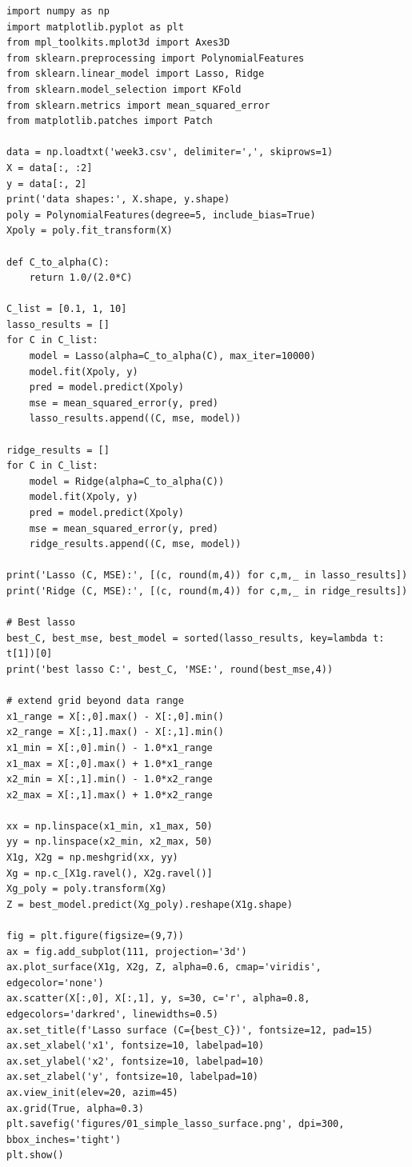 \documentclass[11pt,a4paper]{article}
\begin{document}
\begin{lstlisting}
import numpy as np
import matplotlib.pyplot as plt
from mpl_toolkits.mplot3d import Axes3D
from sklearn.preprocessing import PolynomialFeatures
from sklearn.linear_model import Lasso, Ridge
from sklearn.model_selection import KFold
from sklearn.metrics import mean_squared_error
from matplotlib.patches import Patch

data = np.loadtxt('week3.csv', delimiter=',', skiprows=1)
X = data[:, :2]
y = data[:, 2]
print('data shapes:', X.shape, y.shape)
poly = PolynomialFeatures(degree=5, include_bias=True)
Xpoly = poly.fit_transform(X)

def C_to_alpha(C):
    return 1.0/(2.0*C)

C_list = [0.1, 1, 10]
lasso_results = []
for C in C_list:
    model = Lasso(alpha=C_to_alpha(C), max_iter=10000)
    model.fit(Xpoly, y)
    pred = model.predict(Xpoly)
    mse = mean_squared_error(y, pred)
    lasso_results.append((C, mse, model))

ridge_results = []
for C in C_list:
    model = Ridge(alpha=C_to_alpha(C))
    model.fit(Xpoly, y)
    pred = model.predict(Xpoly)
    mse = mean_squared_error(y, pred)
    ridge_results.append((C, mse, model))

print('Lasso (C, MSE):', [(c, round(m,4)) for c,m,_ in lasso_results])
print('Ridge (C, MSE):', [(c, round(m,4)) for c,m,_ in ridge_results])

# Best lasso
best_C, best_mse, best_model = sorted(lasso_results, key=lambda t: t[1])[0]
print('best lasso C:', best_C, 'MSE:', round(best_mse,4))

# extend grid beyond data range
x1_range = X[:,0].max() - X[:,0].min()
x2_range = X[:,1].max() - X[:,1].min()
x1_min = X[:,0].min() - 1.0*x1_range
x1_max = X[:,0].max() + 1.0*x1_range
x2_min = X[:,1].min() - 1.0*x2_range
x2_max = X[:,1].max() + 1.0*x2_range

xx = np.linspace(x1_min, x1_max, 50)
yy = np.linspace(x2_min, x2_max, 50)
X1g, X2g = np.meshgrid(xx, yy)
Xg = np.c_[X1g.ravel(), X2g.ravel()]
Xg_poly = poly.transform(Xg)
Z = best_model.predict(Xg_poly).reshape(X1g.shape)

fig = plt.figure(figsize=(9,7))
ax = fig.add_subplot(111, projection='3d')
ax.plot_surface(X1g, X2g, Z, alpha=0.6, cmap='viridis', edgecolor='none')
ax.scatter(X[:,0], X[:,1], y, s=30, c='r', alpha=0.8, edgecolors='darkred', linewidths=0.5)
ax.set_title(f'Lasso surface (C={best_C})', fontsize=12, pad=15)
ax.set_xlabel('x1', fontsize=10, labelpad=10)
ax.set_ylabel('x2', fontsize=10, labelpad=10)
ax.set_zlabel('y', fontsize=10, labelpad=10)
ax.view_init(elev=20, azim=45)
ax.grid(True, alpha=0.3)
plt.savefig('figures/01_simple_lasso_surface.png', dpi=300, bbox_inches='tight')
plt.show()


\end{lstlisting}
\end{document}
